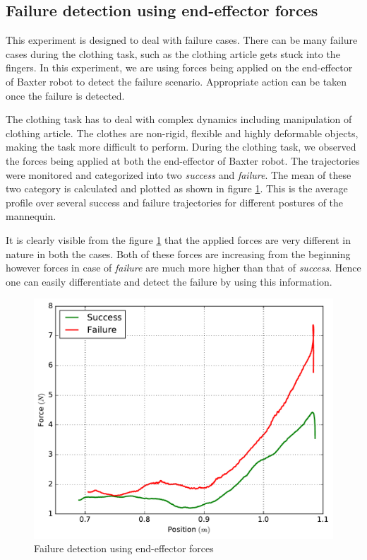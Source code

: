 \documentclass[sigconf]{acmart}
\begin{document}
\subsection{Failure detection using end-effector forces}
This experiment is designed to deal with failure cases. There can be many failure cases during the clothing task, such as the clothing article gets stuck into the fingers. In this experiment, we are using forces being applied on the end-effector of Baxter robot to detect the failure scenario. Appropriate action can be taken once the failure is detected.

The clothing task has to deal with complex dynamics including manipulation of clothing article. The clothes are non-rigid, flexible and highly deformable objects, making the task more difficult to perform. During the clothing task, we observed the forces being applied at both the end-effector of Baxter robot. The trajectories were monitored and categorized into two \textit{success} and \textit{failure}. The mean of these two category is calculated and plotted as shown in figure \ref{fig:position_force}. This is the average profile over several success and failure trajectories for different postures of the mannequin.

It is clearly visible from the figure \ref{fig:position_force} that the applied forces are very different in nature in both the cases. Both of these forces are increasing from the beginning however forces in case of \textit{failure} are much more higher than that of \textit{success}. Hence one can easily differentiate and detect the failure by using this information.

\begin{figure}
	\includegraphics[width=\linewidth]{position_force}
	\caption{Failure detection using end-effector forces}
	\label{fig:position_force}
\end{figure}
\end{document}
